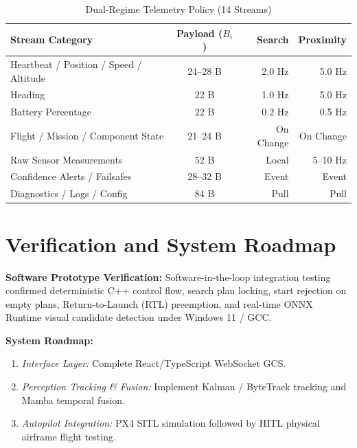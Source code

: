 \documentclass[conference]{IEEEtran}
\begin{document}
\begin{table}[htbp]
\caption{Dual-Regime Telemetry Policy (14 Streams)}
\label{tab:telemetry_policy}
\centering
\scriptsize
\begin{tabular*}{\columnwidth}{@{\extracolsep{\fill}}lcrr@{}}
\toprule
\textbf{Stream Category} & \textbf{Payload ($B_i$)} & \textbf{Search} & \textbf{Proximity} \\
\midrule
Heartbeat / Position / Speed / Altitude & 24--28 B & 2.0 Hz & 5.0 Hz \\
Heading & 22 B & 1.0 Hz & 5.0 Hz \\
Battery Percentage & 22 B & 0.2 Hz & 0.5 Hz \\
Flight / Mission / Component State & 21--24 B & On Change & On Change \\
Raw Sensor Measurements & 52 B & Local & 5--10 Hz \\
Confidence Alerts / Failsafes & 28--32 B & Event & Event \\
Diagnostics / Logs / Config & 84 B & Pull & Pull \\
\bottomrule
\end{tabular*}
\end{table}

\section{Verification and System Roadmap}
\textbf{Software Prototype Verification:} Software-in-the-loop integration testing confirmed deterministic C++ control flow, search plan locking, start rejection on empty plans, Return-to-Launch (RTL) preemption, and real-time ONNX Runtime visual candidate detection under Windows 11 / GCC.

\textbf{System Roadmap:}
\begin{enumerate}
    \item \emph{Interface Layer:} Complete React/TypeScript WebSocket GCS.
    \item \emph{Perception Tracking \& Fusion:} Implement Kalman / ByteTrack tracking and Mamba temporal fusion.
    \item \emph{Autopilot Integration:} PX4 SITL simulation followed by HITL physical airframe flight testing.
\end{enumerate}
\end{document}
